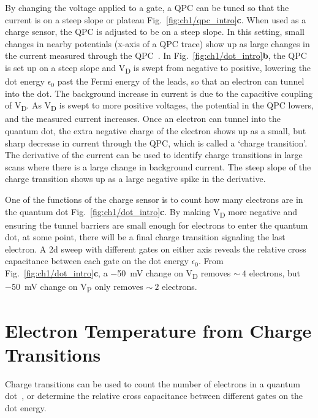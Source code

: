 By changing the voltage applied to a gate, a QPC can be tuned so that the current is on a steep slope or plateau Fig.~\ref{fig:ch1/qpc_intro}\textbf{c}. When used as a charge sensor, the QPC is adjusted to be on a steep slope. In this setting, small changes in nearby potentials (x-axis of a QPC trace) show up as large changes in the current measured through the QPC~\cite{cs_design}. In Fig.~\ref{fig:ch1/dot_intro}\textbf{b}, the QPC is set up on a steep slope and V\textsubscript{D} is swept from negative to positive, lowering the dot energy $\epsilon_0$ past the Fermi energy of the leads, so that an electron can tunnel into the dot. The background increase in current is due to the capacitive coupling of V\textsubscript{D}. As V\textsubscript{D} is swept to more positive voltages, the potential in the QPC lowers, and the measured current increases. Once an electron can tunnel into the quantum dot, the extra negative charge of the electron shows up as a small, but sharp decrease in current through the QPC, which is called a `charge transition'. The derivative of the current can be used to identify charge transitions in large scans where there is a large change in background current. The steep slope of the charge transition shows up as a large negative spike in the derivative. 

One of the functions of the charge sensor is to count how many electrons are in the quantum dot Fig.~\ref{fig:ch1/dot_intro}\textbf{c}. By making V\textsubscript{D} more negative and ensuring the tunnel barriers are small enough for electrons to enter the quantum dot, at some point, there will be a final charge transition signaling the last electron. A 2d sweep with different gates on either axis reveals the relative cross capacitance between each gate on the dot energy $\epsilon_0$. From Fig.~\ref{fig:ch1/dot_intro}\textbf{c}, a \qty{-50}{mV} change on V\textsubscript{D} removes $\sim~4$ electrons, but \qty{-50}{mV} change on V\textsubscript{P} only removes $\sim~2$ electrons.



\section{Electron Temperature from Charge Transitions}



Charge transitions can be used to count the number of electrons in a quantum dot~\cite{electron_counting}, or determine the relative cross capacitance between different gates on the dot energy.

